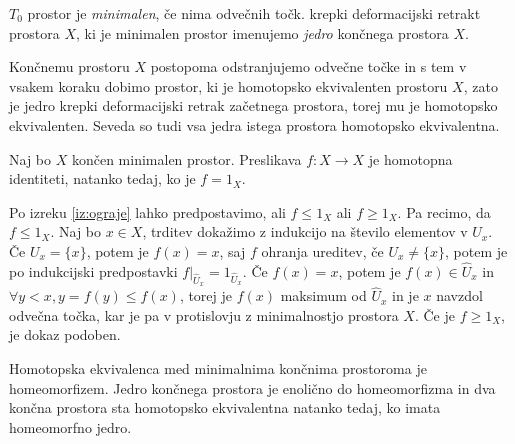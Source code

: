 \documentclass[mat1]{fmfdelo}
\begin{document}
\begin{definicija}
    $T_0$ prostor je \textit{minimalen}, če nima odvečnih točk. krepki deformacijski retrakt prostora $X$, ki je minimalen prostor imenujemo \textit{jedro} končnega prostora $X$.
\end{definicija}

Končnemu prostoru $X$ postopoma odstranjujemo odvečne točke in s tem v vsakem koraku dobimo prostor, ki je homotopsko ekvivalenten prostoru $X$, zato je jedro krepki deformacijski retrak začetnega prostora, torej mu je homotopsko ekvivalenten. Seveda so tudi vsa jedra istega prostora homotopsko ekvivalentna.

\begin{izrek}
    Naj bo $X$ končen minimalen prostor. Preslikava $f:X\rightarrow X$ je homotopna identiteti, natanko tedaj, ko je $f=1_X$.
    \label{iz:identiteta}
\end{izrek}

\begin{dokaz}
    Po izreku \ref{iz:ograje} lahko predpostavimo, ali 
    $f\leq 1_X$ ali $f\geq 1_X$. %
    Pa recimo, da $f\leq 1_X$. 
    Naj bo $x\in X$, trditev dokažimo z indukcijo na 
    število elementov v $U_x$. Če $U_x=\{x\}$, potem je 
    $f(x)=x$, saj $f$ ohranja ureditev, če $U_x\neq\{x\}$, potem 
    je po indukcijski predpostavki 
    $f|_{\hat{U}_x}=1_{\hat{U}_x}$. Če $f(x)=x$, potem je 
    $f(x)\in \hat{U}_x$ in $\forall y < x, y=f(y)\leq 
    f(x)$, torej je $f(x)$ maksimum od $\hat{U}_x$ in je 
    $x$ navzdol odvečna točka, kar je pa v protislovju 
    z minimalnostjo prostora $X$. Če je $f\geq 1_X$, je 
    dokaz podoben.
\end{dokaz}

\begin{posledica}
    Homotopska ekvivalenca med minimalnima končnima prostoroma je homeomorfizem. Jedro končnega prostora je enolično do homeomorfizma in dva končna prostora sta homotopsko ekvivalentna natanko tedaj, ko imata homeomorfno jedro.
\end{posledica}
\end{document}
